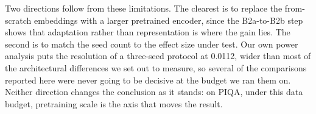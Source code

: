 \documentclass[11pt]{article}
\begin{document}
Two directions follow from these limitations. The clearest is to replace the from-scratch embeddings with a larger pretrained encoder, since the B2a-to-B2b step shows that adaptation rather than representation is where the gain lies. The second is to match the seed count to the effect size under test. Our own power analysis puts the resolution of a three-seed protocol at 0.0112, wider than most of the architectural differences we set out to measure, so several of the comparisons reported here were never going to be decisive at the budget we ran them on. Neither direction changes the conclusion as it stands: on PIQA, under this data budget, pretraining scale is the axis that moves the result.


\end{document}
